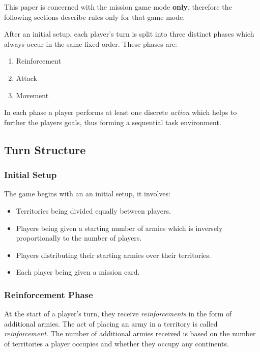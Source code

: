 \documentclass[parskip]{cs4rep}
\begin{document}
This paper is concerned with the mission game mode \textbf{only}, therefore the following sections describe rules only for that game mode.

After an initial setup, each player's turn is split into three distinct phases which always occur in the same fixed order. These phases are:

\begin{enumerate}
\item
Reinforcement
\item
Attack
\item
Movement
\newline
\end{enumerate}

In each phase a player performs at least one discrete \textit{action} which helps to further the players goals, thus forming a sequential task environment.

\subsection{Turn Structure}

\subsubsection{Initial Setup}

The game begins with an an initial setup, it involves:

\begin{itemize}
\item
Territories being divided equally between players.
\item
Players being given a starting number of armies which is inversely proportionally to the number of players.
\item
Players distributing their starting armies over their territories.
\item
Each player being given a mission card.
\end{itemize}

\subsubsection{Reinforcement Phase}

At the start of a player's turn, they receive \textit{reinforcements} in the form of additional armies. The act of placing an army in a territory is called \textit{reinforcement}.  The number of additional armies received is based on the number of territories a player occupies and whether they occupy any continents.
\newline
\end{document}
